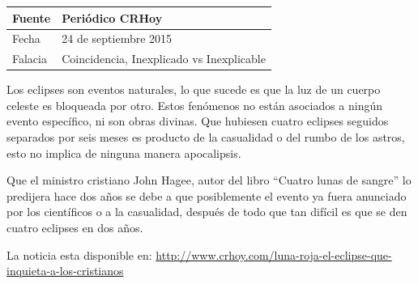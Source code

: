\documentclass[times]{simauth}
\begin{document}
\newpage
\begin{table}[h!]
    \begin{tabular}{ll} 
        \toprule[1.5pt]
        Fuente & Periódico CRHoy\\
        \midrule[0.5pt]
        Fecha  & 24 de septiembre 2015\\
        \midrule[0.5pt]
        Falacia & Coincidencia, Inexplicado vs Inexplicable \\
        \bottomrule[1.5pt]
    \end{tabular} 
\end{table}

Los eclipses son eventos naturales, lo que sucede es que la luz de un cuerpo celeste es bloqueada por otro. Estos fenómenos no están asociados a ningún evento específico, ni son obras divinas. Que hubiesen cuatro eclipses seguidos separados por seis meses es producto de la casualidad o del rumbo de los astros, esto no implica de ninguna manera apocalipsis.  

Que el ministro cristiano John Hagee, autor del libro ``Cuatro lunas de sangre'' lo predijera hace dos años se debe a que posiblemente el evento ya fuera anunciado por los científicos o a la casualidad, después de todo que tan difícil es que se den cuatro eclipses en dos años. 

La noticia esta disponible en: \href{http://www.crhoy.com/luna-roja-el-eclipse-que-inquieta-a-los-cristianos}{http://www.crhoy.com/luna-roja-el-eclipse-que-inquieta-a-los-cristianos}


\newpage
\end{document}

